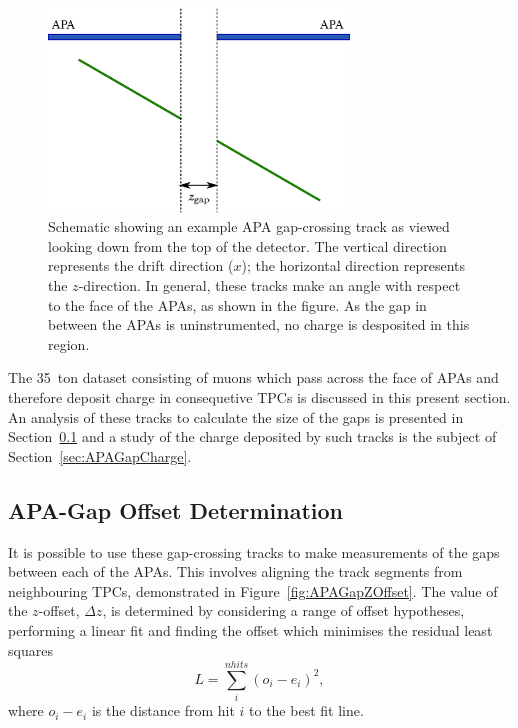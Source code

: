 \begin{figure}
  \centering
  \includegraphics[width=8cm]{apa_gap.eps}
  \caption{Schematic showing an example APA gap-crossing track as viewed looking down from the top of the detector.  The vertical direction represents the drift direction ($x$); the horizontal direction represents the $z$-direction.  In general, these tracks make an angle with respect to the face of the APAs, as shown in the figure.  As the gap in between the APAs is uninstrumented, no charge is desposited in this region.}
  \label{fig:APAGapCrosser}
\end{figure}

The 35~ton dataset consisting of muons which pass across the face of APAs and therefore deposit charge in consequetive TPCs is discussed in this present section.  An analysis of these tracks to calculate the size of the gaps is presented in Section~\ref{sec:APAGapOffsets} and a study of the charge deposited by such tracks is the subject of Section~\ref{sec:APAGapCharge}.

\subsection{APA-Gap Offset Determination}\label{sec:APAGapOffsets}

It is possible to use these gap-crossing tracks to make measurements of the gaps between each of the APAs.  This involves aligning the track segments from neighbouring TPCs, demonstrated in Figure~\ref{fig:APAGapZOffset}.  The value of the $z$-offset, $\Delta z$, is determined by considering a range of offset hypotheses, performing a linear fit and finding the offset which minimises the residual least squares
\begin{equation}
  L = \sum_i^{nhits} (o_i - e_i)^2,
\end{equation}
where $o_i-e_i$ is the distance from hit $i$ to the best fit line.


